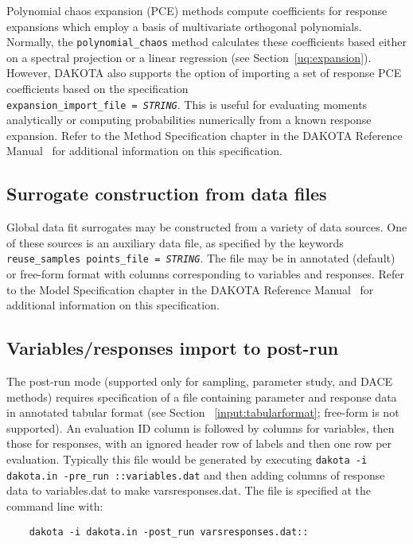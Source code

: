 Polynomial chaos expansion (PCE) methods compute coefficients for
response expansions which employ a basis of multivariate orthogonal
polynomials.  Normally, the \texttt{polynomial\_chaos} method
calculates these coefficients based either on a spectral projection or
a linear regression (see Section~\ref{uq:expansion}).  However,
DAKOTA also supports the option of importing a set of response PCE
coefficients based on the specification \\
\texttt{expansion\_import\_file = \emph{STRING}}.  This is useful for
evaluating moments analytically or computing probabilities numerically
from a known response expansion.  Refer to the Method Specification
chapter in the DAKOTA Reference Manual~\cite{RefMan} for additional
information on this specification.

\subsection{Surrogate construction from data files}

Global data fit surrogates may be constructed from a variety of data
sources.  One of these sources is an auxiliary data file, as specified
by the keywords \texttt{reuse\_samples points\_file = \emph{STRING}}.
The file may be in annotated (default) or free-form format with
columns corresponding to variables and responses.  Refer to the Model
Specification chapter in the DAKOTA Reference Manual~\cite{RefMan} for
additional information on this specification.

\subsection{Variables/responses import to post-run}

The post-run mode (supported only for sampling, parameter study, and
DACE methods) requires specification of a file containing parameter
and response data in annotated tabular format (see Section
~\ref{input:tabularformat}; free-form is not supported).  An
evaluation ID column is followed by columns for variables, then those
for responses, with an ignored header row of labels and then one row
per evaluation.  Typically this file would be generated by executing
\texttt{dakota -i dakota.in -pre\_run ::variables.dat} and then adding
columns of response data to variables.dat to make varsresponses.dat.
The file is specified at the command line with:
\begin{small}
\begin{verbatim}
    dakota -i dakota.in -post_run varsresponses.dat::
\end{verbatim}
\end{small}


